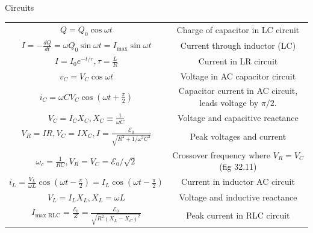 \documentclass{article}
\begin{document}
\begin{center}
\begin{section}{Circuits}
\begin{tabular}{|c|c|}
		 $Q = Q_0 \cos \omega t$                                                        & Charge of capacitor in LC circuit                 \\

		 $I = - \frac{dQ}{dt} = \omega Q_0 \sin \omega t = I_\text{max} \sin \omega t$  & Current through inductor (LC)                     \\

		 $I = I_0 e^{-t / \tau}, \tau = \frac{L}{R}$                                    & Current in LR circuit                             \\

		 $v_C = V_C \cos \omega t$                                                      & Voltage in AC capacitor circuit                   \\

		 $i_C = \omega C V_C \cos \left(\omega t + \frac{\pi}{2} \right)$               & \makecell{Capacitor current in AC circuit, leads  \\
		 voltage by $\pi/2$.}                                                                                                               \\

		 $V_C = I_C X_C, X_C \equiv \frac{1}{\omega C}$                                 & Voltage and capacitive reactance                  \\

		 $V_R = IR, V_C = I X_C, I = \frac{\mathcal E_0}{\sqrt{ R^2 + 1/\omega^2 C^2}}$ & Peak voltages and current                         \\

		 $\omega_c = \frac{1}{RC}, V_R = V_C = \mathcal E_0 / \sqrt{2}$                 & Crossover frequency where $V_R = V_C$ (fig 32.11) \\

		 $i_L = \frac{V_L}{\omega L} \cos \left(\omega t - \frac{\pi}{2} \right)
		 = I_L  \cos \left(\omega t - \frac{\pi}{2} \right) $                           & Current in inductor AC circuit                    \\

		 $V_L = I_L X_L, X_L = \omega L$                                                & Voltage and inductive reactance                   \\

		 $I_\text{max RLC} = \frac{\mathcal E_0}{Z}
		 = \frac{\mathcal E_0}{\sqrt{R^2 (X_L - X_C)^2}}$                               & Peak current in RLC circuit                       \\


\end{tabular}
\end{section}
\end{center}
\end{document}

